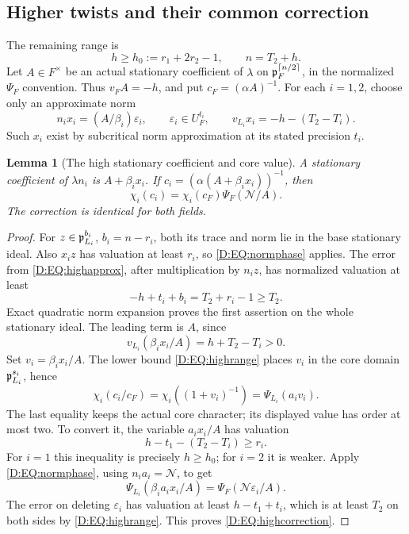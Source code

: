 \documentclass[11pt]{amsart}
\newtheorem{lemma}[theorem]{Lemma}
\theoremstyle{definition}
\theoremstyle{remark}
\newcommand{\ceil}[1]{\left\lceil #1\right\rceil}
\begin{document}
\subsection{Higher twists and their common correction}
The remaining range is
\begin{equation}\label{D:EQ:highrange}
 h\ge h_0:=r_1+2r_2-1,\qquad n=T_2+h.
\end{equation}
Let $A\in F^\times$ be an actual stationary coefficient of $\lambda$
on $\pp_F^{\ceil{n/2}}$, in the normalized $\Psi_F$ convention.
Thus $v_FA=-h$, and put $c_F=(\alpha A)^{-1}$.
For each $i=1,2$, choose only an approximate norm
\begin{equation}\label{D:EQ:highapprox}
 n_i x_i=(A/\beta_i)\varepsilon_i,\qquad
 \varepsilon_i\in U_F^{t_i},\qquad
 v_{L_i}x_i=-h-(T_2-T_i).
\end{equation}
Such $x_i$ exist by subcritical norm approximation at its stated
precision $t_i$.

\begin{lemma}[The high stationary coefficient and core value]\label{D:EQ:highcoef}
A stationary coefficient of $\lambda n_i$ is $A+\beta_ix_i$.
If $c_i=(\alpha(A+\beta_ix_i))^{-1}$, then
\begin{equation}\label{D:EQ:highcorrection}
 \chi_i(c_i)=\chi_i(c_F)\Psi_F(\mathcal N/A).
\end{equation}
The correction is identical for both fields.
\end{lemma}
\begin{proof}
For $z\in\mathfrak p_{L_i}^{b_i}$, $b_i=n-r_i$, both its trace and norm lie
in the base stationary ideal. Also $x_iz$ has valuation at least
$r_i$, so \eqref{D:EQ:normphase} applies. The error from
\eqref{D:EQ:highapprox}, after multiplication by $n_i z$, has normalized
valuation at least
\[
 -h+t_i+b_i=T_2+r_i-1\ge T_2.
\]
Exact quadratic norm expansion proves the first assertion on the
whole stationary ideal. The leading term is $A$, since
\[
 v_{L_i}(\beta_ix_i/A)=h+T_2-T_i>0.
\]
Set $v_i=\beta_ix_i/A$. The lower bound \eqref{D:EQ:highrange} places
$v_i$ in the core domain $\mathfrak p_{L_i}^{s_i}$, hence
\[
 \chi_i(c_i/c_F)=\chi_i((1+v_i)^{-1})
                        =\Psi_{L_i}(a_i v_i).
\]
The last equality keeps the actual core character; its displayed
value has order at most two. To convert it, the variable
$a_ix_i/A$ has valuation
\[
 h-t_1-(T_2-T_i)\ge r_i.
\]
For $i=1$ this inequality is precisely $h\ge h_0$; for $i=2$ it is
weaker. Apply \eqref{D:EQ:normphase}, using $n_i a_i=\mathcal N$, to get
\[
 \Psi_{L_i}(\beta_i a_ix_i/A)
                      =\Psi_F(\mathcal N\varepsilon_i/A).
\]
The error on deleting $\varepsilon_i$ has valuation at least
$h-t_1+t_i$, which is at least $T_2$ on both sides by
\eqref{D:EQ:highrange}. This proves \eqref{D:EQ:highcorrection}.
\end{proof}
\end{document}
